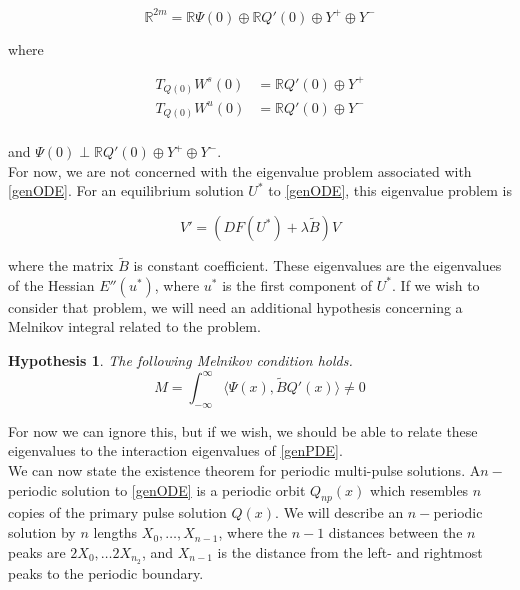 \documentclass[12pt]{article}
\def\R{{\mathbb R}}
\newtheorem{hypothesis}{Hypothesis}
\begin{document}
\begin{equation}
\R^{2m} = \R \Psi(0) \oplus \R Q'(0) \oplus Y^+ \oplus Y^-
\end{equation}

where

\begin{align*}
T_{Q(0)}W^s(0) &= \R Q'(0) \oplus Y^+ \\
T_{Q(0)}W^u(0) &= \R Q'(0) \oplus Y^- \\
\end{align*}

and $\Psi(0) \perp \R Q'(0) \oplus Y^+ \oplus Y^-$.\\

For now, we are not concerned with the eigenvalue problem associated with \eqref{genODE}. For an equilibrium solution $U^*$ to \eqref{genODE}, this eigenvalue problem is

\begin{equation}\label{genODEeig}
V' = (DF(U^*) + \lambda \tilde{B})V
\end{equation}

where the matrix $\tilde{B}$ is constant coefficient. These eigenvalues are the eigenvalues of the Hessian $E''(u^*)$, where $u^*$ is the first component of $U^*$. If we wish to consider that problem, we will need an additional hypothesis concerning a Melnikov integral related to the problem.

\begin{hypothesis}\label{ODEMelnikov}
The following Melnikov condition holds.
\begin{equation}
M = \int_{-\infty}^\infty \langle \Psi(x), \tilde{B} Q'(x) \rangle \neq 0
\end{equation}
\end{hypothesis}

For now we can ignore this, but if we wish, we should be able to relate these eigenvalues to the interaction eigenvalues of \eqref{genPDE}.\\

We can now state the existence theorem for periodic multi-pulse solutions. A$n-$periodic solution to \eqref{genODE} is a periodic orbit $Q_{np}(x)$ which resembles $n$ copies of the primary pulse solution $Q(x)$. We will describe an $n-$periodic solution by $n$ lengths $X_0, \dots, X_{n-1}$, where the $n-1$ distances between the $n$ peaks are $2X_0, \dots 2X_{n_2}$, and $X_{n-1}$ is the distance from the left- and rightmost peaks to the periodic boundary.
\end{document}
